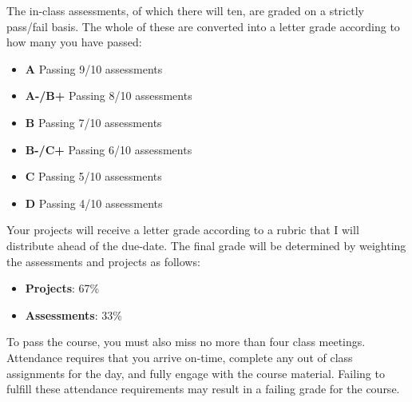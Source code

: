 \documentclass[12pt]{article}
\begin{document}
The in-class assessments, of which there will ten, are graded on
a strictly pass/fail basis. The whole of these are converted into
a letter grade according to how many you have passed:
\begin{itemize}\setlength\itemsep{0em}
\item \textbf{A} \quad \quad \quad Passing 9/10 assessments
\item \textbf{A-/B+} \quad Passing 8/10 assessments
\item \textbf{B} \quad \quad \quad Passing 7/10 assessments
\item \textbf{B-/C+} \quad Passing 6/10 assessments
\item \textbf{C} \quad \quad \quad Passing 5/10 assessments
\item \textbf{D} \quad \quad \quad Passing 4/10 assessments
\end{itemize}
Your projects will receive a letter grade according to a rubric that
I will distribute ahead of the due-date. The final grade will be
determined by weighting the assessments and projects as follows:
\begin{itemize}\setlength\itemsep{0em}
\item \textbf{Projects}: 67\%
\item \textbf{Assessments}: 33\%
\end{itemize}
To pass the course, you must also miss no more than four class meetings.
Attendance requires that you arrive on-time, complete any out of class
assignments for the day, and fully engage with the course material.
Failing to fulfill these attendance requirements may result in a failing
grade for the course.



\end{document}
